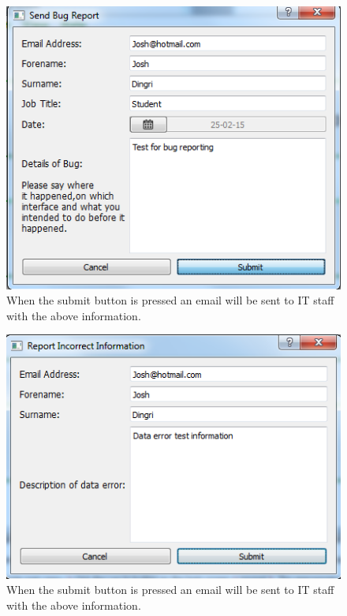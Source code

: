 \begin{figure}[H]
    \includegraphics[width=\textwidth]{./Testing/Images/SubmitBugTest.png}
    \caption{When the submit button is pressed an email will be sent to IT staff with the above information.} \label{fig:SubmitBugTest}
\end{figure}

\begin{figure}[H]
    \includegraphics[width=\textwidth]{./Testing/Images/SubmitErrorReport}
    \caption{When the submit button is pressed an email will be sent to IT staff with the above information.} \label{fig:SubmitErrorReport}
\end{figure}

